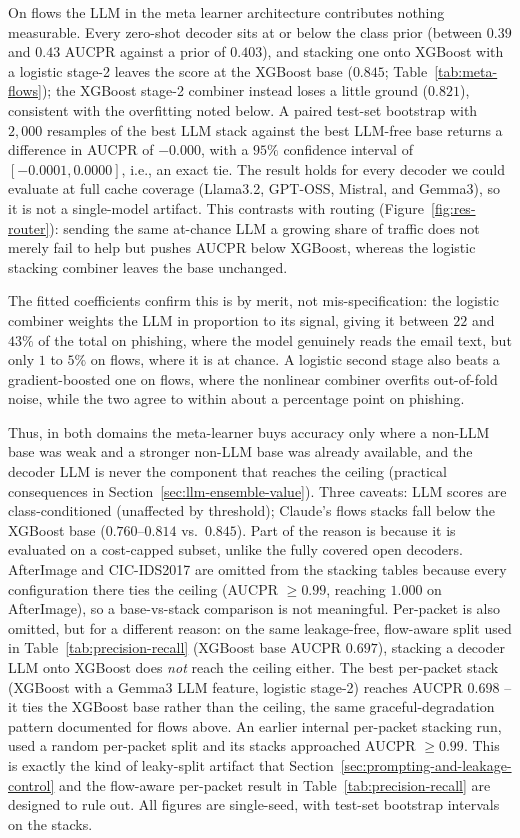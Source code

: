 \documentclass{jmlr}
\begin{document}
On flows the LLM in the meta learner architecture contributes nothing measurable. Every zero-shot decoder sits at or below the class prior (between $0.39$ and $0.43$ AUCPR against a prior of $0.403$), and stacking one onto XGBoost with a logistic stage-2 leaves the score at the XGBoost base ($0.845$; Table~\ref{tab:meta-flows}); the XGBoost stage-2 combiner instead loses a little ground ($0.821$), consistent with the overfitting noted below. A paired test-set bootstrap with $2{,}000$ resamples of the best LLM stack against the best LLM-free base returns a difference in AUCPR of $-0.000$, with a $95\%$ confidence interval of $[-0.0001, 0.0000]$, i.e., an exact tie. The result holds for every decoder we could evaluate at full cache coverage (Llama3.2, GPT-OSS, Mistral, and Gemma3), so it is not a single-model artifact. This contrasts with routing (Figure~\ref{fig:res-router}): sending the same at-chance LLM a growing share of traffic does not merely fail to help but pushes AUCPR below XGBoost, whereas the logistic stacking combiner leaves the base unchanged.

The fitted coefficients confirm this is by merit, not mis-specification: the logistic combiner weights the LLM in proportion to its signal, giving it between $22$ and $43\%$ of the total on phishing, where the model genuinely reads the email text, but only $1$ to $5\%$ on flows, where it is at chance. A logistic second stage also beats a gradient-boosted one on flows, where the nonlinear combiner overfits out-of-fold noise, while the two agree to within about a percentage point on phishing.

Thus, in both domains the meta-learner buys accuracy only where a non-LLM base was weak and a stronger non-LLM base was already available, and the decoder LLM is never the component that reaches the ceiling (practical consequences in Section~\ref{sec:llm-ensemble-value}). Three caveats: LLM scores are class-conditioned (unaffected by threshold); Claude's flows stacks fall below the XGBoost base ($0.760$--$0.814$ vs.\ $0.845$). Part of the reason is because it is evaluated on a cost-capped subset, unlike the fully covered open decoders. AfterImage and CIC-IDS2017 are omitted from the stacking tables because every configuration there ties the ceiling (AUCPR $\geq 0.99$, reaching $1.000$ on AfterImage), so a base-vs-stack comparison is not meaningful. Per-packet is also omitted, but for a different reason: on the same leakage-free, flow-aware split used in Table~\ref{tab:precision-recall} (XGBoost base AUCPR $0.697$), stacking a decoder LLM onto XGBoost does \emph{not} reach the ceiling either. The best per-packet stack (XGBoost with a Gemma3 LLM feature, logistic stage-2) reaches AUCPR $0.698$ -- it ties the XGBoost base rather than the ceiling, the same graceful-degradation pattern documented for flows above. An earlier internal per-packet stacking run, used a random per-packet split and its stacks approached AUCPR $\geq 0.99$. This is exactly the kind of leaky-split artifact that Section~\ref{sec:prompting-and-leakage-control} and the flow-aware per-packet result in Table~\ref{tab:precision-recall} are designed to rule out. All figures are single-seed, with test-set bootstrap intervals on the stacks.
\end{document}
